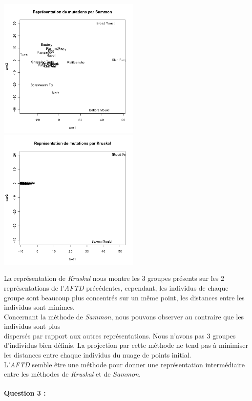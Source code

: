 \documentclass[a4paper, 10pt]{article}
\begin{document}
\begin{center}
\includegraphics[height = 7cm, width = 7cm]{plots/plot_mutations_sammon.png}
\includegraphics[height = 7cm, width = 7cm]{plots/plot_mutations_kruskal.png}
\end{center}
La représentation de \textit{Kruskal} nous montre les 3 groupes présents sur les 2 représentations de l'\textit{AFTD} précédentes,
cependant, les individus de chaque groupe sont beaucoup plus concentrés sur un même point, les distances entre les individus sont minimes.\\
Concernant la méthode de \textit{Sammon}, nous pouvons observer au contraire que les individus sont plus\\dispersés par rapport aux autres
représentations. Nous n'avons pas 3 groupes d'individus bien définis. La projection par cette méthode ne tend pas à minimiser les distances
entre chaque individus du nuage de points initial.\\
L'\textit{AFTD} semble être une méthode pour donner une représentation intermédiaire entre les méthodes de \textit{Kruskal} et de
\textit{Sammon}.\\ \\
\newpage
\textbf{Question 3 :}\\
\end{document}
